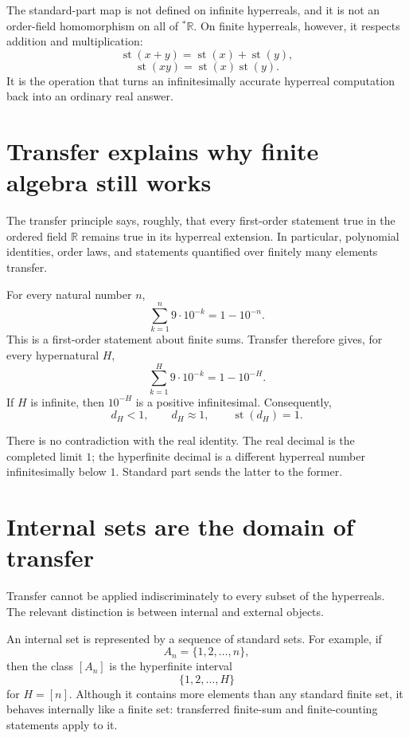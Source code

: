 The standard-part map is not defined on infinite hyperreals, and it is not an order-field homomorphism on all of \({}^*\mathbb R\).  On finite hyperreals, however, it respects addition and multiplication:
\[
  \operatorname{st}(x+y)=\operatorname{st}(x)+\operatorname{st}(y),
\]
\[
  \operatorname{st}(xy)=\operatorname{st}(x)\operatorname{st}(y).
\]
It is the operation that turns an infinitesimally accurate hyperreal computation back into an ordinary real answer.

\section{Transfer explains why finite algebra still works}

The transfer principle says, roughly, that every first-order statement true in the ordered field \(\mathbb R\) remains true in its hyperreal extension.  In particular, polynomial identities, order laws, and statements quantified over finitely many elements transfer.

For every natural number \(n\),
\[
  \sum_{k=1}^{n}9\cdot10^{-k}=1-10^{-n}.
\]
This is a first-order statement about finite sums.  Transfer therefore gives, for every hypernatural \(H\),
\[
  \sum_{k=1}^{H}9\cdot10^{-k}=1-10^{-H}.
\]
If \(H\) is infinite, then \(10^{-H}\) is a positive infinitesimal.  Consequently,
\[
  d_H<1,
  \qquad
  d_H\approx1,
  \qquad
  \operatorname{st}(d_H)=1.
\]

There is no contradiction with the real identity.  The real decimal is the completed limit \(1\); the hyperfinite decimal is a different hyperreal number infinitesimally below \(1\).  Standard part sends the latter to the former.

\section{Internal sets are the domain of transfer}

Transfer cannot be applied indiscriminately to every subset of the hyperreals.  The relevant distinction is between internal and external objects.

An internal set is represented by a sequence of standard sets.  For example, if
\[
  A_n=\{1,2,\ldots,n\},
\]
then the class \([A_n]\) is the hyperfinite interval
\[
  \{1,2,\ldots,H\}
\]
for \(H=[n]\).  Although it contains more elements than any standard finite set, it behaves internally like a finite set: transferred finite-sum and finite-counting statements apply to it.


